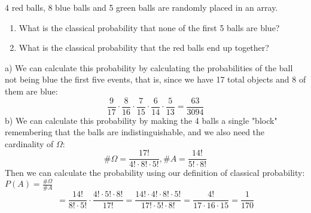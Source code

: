 \documentclass{article}
\begin{document}
        \begin{solutions}
            4 red balls, 8 blue balls and 5 green balls are randomly placed in an array.
            \begin{enumerate}[label=\alph*)]
                \item What is the classical probability that none of the first 5 balls are blue?
                \item What is the classical probability that the red balls end up together?
            \end{enumerate}
            \medskip
            \noindent a) We can calculate this probability by calculating the probabilities of the ball not being blue the first five events, that is, since we have 17 total objects and 8 of them are blue:
            \[ 
                \frac{9}{17} \cdot \frac{8}{16} \cdot \frac{7}{15} \cdot \frac{6}{14} \cdot \frac{5}{13} = \frac{63}{3094}
            \]
            \noindent b) We can calculate this probability by making the 4 balls a single "block" remembering that the balls are indistinguishable, and we also need the cardinality of $\Omega$:
            \[ 
                \#\Omega = \frac{17!}{4! \cdot 8! \cdot 5!}, \# A = \frac{14!}{5! \cdot 8!} 
            \]
            Then we can calculate the probability using our definition of classical probability: $P(A) = \frac{\#\Omega}{\# A}$
            \[ 
                = \frac{14!}{8! \cdot 5!} \cdot \frac{4! \cdot 5! \cdot 8!}{17!} = \frac{14! \cdot 4! \cdot 8! \cdot 5!}{17! \cdot 5! \cdot 8!} = \frac{4!}{17 \cdot 16 \cdot 15} = \frac{1}{170}
            \]
        \end{solutions}

    
\end{document}
